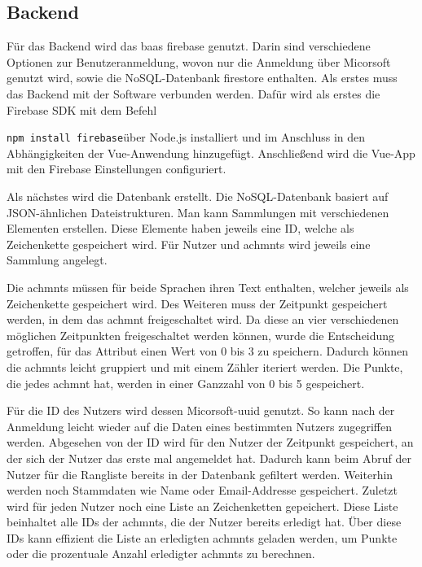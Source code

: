 \documentclass[11pt]{article}
\begin{document}
\subsection{Backend}

Für das Backend wird das \gls{baas} \gls{firebase} genutzt. Darin sind verschiedene Optionen zur Benutzeranmeldung, 
wovon nur die Anmeldung über Micorsoft genutzt wird, sowie die \Gls{NoSQL}-Datenbank \gls{firestore} enthalten. 
Als erstes muss das Backend mit der Software verbunden werden. Dafür wird als erstes die Firebase SDK mit dem Befehl

\texttt{npm install firebase}\newline über Node.js installiert und im Anschluss in den
Abhängigkeiten der Vue-Anwendung hinzugefügt.
Anschließend wird die Vue-App mit den Firebase Einstellungen configuriert.

Als nächstes wird die Datenbank erstellt. Die \gls{NoSQL}-Datenbank basiert auf JSON-ähnlichen
Dateistrukturen. Man kann Sammlungen mit verschiedenen Elementen erstellen. Diese Elemente haben jeweils eine ID, welche
als Zeichenkette gespeichert wird. Für Nutzer und \glspl{achmnt} wird jeweils eine Sammlung angelegt. 

Die \glspl{achmnt} müssen für beide Sprachen ihren Text enthalten, welcher jeweils als Zeichenkette gespeichert wird.
Des Weiteren muss der Zeitpunkt gespeichert werden, in dem das \gls{achmnt} freigeschaltet wird. Da diese an vier verschiedenen
möglichen Zeitpunkten freigeschaltet werden können, wurde die Entscheidung getroffen, für das Attribut einen Wert von 0 bis 3 zu speichern.
Dadurch können die \glspl{achmnt} leicht gruppiert und mit einem Zähler iteriert werden.
Die Punkte, die jedes \gls{achmnt} hat, werden in einer Ganzzahl von 0 bis 5 gespeichert.

Für die ID des Nutzers wird dessen Micorsoft-\gls{uuid} genutzt. So kann nach der Anmeldung leicht wieder auf die
Daten eines bestimmten Nutzers zugegriffen werden. Abgesehen von der ID wird für den Nutzer der Zeitpunkt gespeichert, an der sich der Nutzer das erste mal
angemeldet hat. Dadurch kann beim Abruf der Nutzer für die Rangliste bereits in der Datenbank gefiltert werden.
Weiterhin werden noch Stammdaten wie Name oder Email-Addresse gespeichert.
Zuletzt wird für jeden Nutzer noch eine Liste an Zeichenketten gepeichert. Diese Liste beinhaltet alle IDs der \glspl{achmnt}, die der
Nutzer bereits erledigt hat. Über diese IDs kann effizient die Liste an erledigten \glspl{achmnt} geladen werden, um Punkte oder
die prozentuale Anzahl erledigter \glspl{achmnt} zu berechnen.
\end{document}

